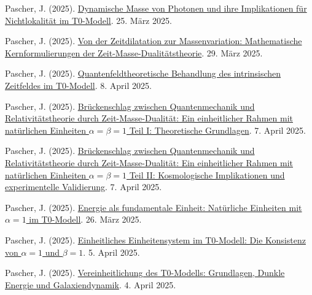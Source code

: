 \documentclass[12pt,a4paper]{article}
\begin{document}
\begin{thebibliography}{99}
		 Pascher, J. (2025). \href{https://github.com/jpascher/T0-Time-Mass-Duality/tree/main/2/pdf/Deutsch/DynMassePhotonenNichtlokal.pdf}{Dynamische Masse von Photonen und ihre Implikationen für Nichtlokalität im T0-Modell}. 25. März 2025.
		
		 Pascher, J. (2025). \href{https://github.com/jpascher/T0-Time-Mass-Duality/tree/main/2/pdf/Deutsch/MathZeitMasseLagrange.pdf}{Von der Zeitdilatation zur Massenvariation: Mathematische Kernformulierungen der Zeit-Masse-Dualitätstheorie}. 29. März 2025.
		
		 Pascher, J. (2025). \href{https://github.com/jpascher/T0-Time-Mass-Duality/tree/main/2/pdf/Deutsch/QFTIntrinsischesZeitT0.pdf}{Quantenfeldtheoretische Behandlung des intrinsischen Zeitfeldes im T0-Modell}. 8. April 2025.
		
		 Pascher, J. (2025). \href{https://github.com/jpascher/T0-Time-Mass-Duality/tree/main/2/pdf/Deutsch/QMRelTimeMassPart1Z.pdf}{Brückenschlag zwischen Quantenmechanik und Relativitätstheorie durch Zeit-Masse-Dualität: Ein einheitlicher Rahmen mit natürlichen Einheiten $\alpha = \beta = 1$ Teil I: Theoretische Grundlagen}. 7. April 2025.
		
		 Pascher, J. (2025). \href{https://github.com/jpascher/T0-Time-Mass-Duality/tree/main/2/pdf/Deutsch/QMRelTimeMassPart2Z.pdf}{Brückenschlag zwischen Quantenmechanik und Relativitätstheorie durch Zeit-Masse-Dualität: Ein einheitlicher Rahmen mit natürlichen Einheiten $\alpha = \beta = 1$ Teil II: Kosmologische Implikationen und experimentelle Validierung}. 7. April 2025.
		
		 Pascher, J. (2025). \href{https://github.com/jpascher/T0-Time-Mass-Duality/tree/main/2/pdf/Deutsch/NatEinheitenAlpha1.pdf}{Energie als fundamentale Einheit: Natürliche Einheiten mit $\alpha = 1$ im T0-Modell}. 26. März 2025.
		
		 Pascher, J. (2025). \href{https://github.com/jpascher/T0-Time-Mass-Duality/tree/main/2/pdf/Deutsch/Alpha1Beta1Konsistenz.pdf}{Einheitliches Einheitensystem im T0-Modell: Die Konsistenz von $\alpha = 1$ und $\beta = 1$}. 5. April 2025.
		
		 Pascher, J. (2025). \href{https://github.com/jpascher/T0-Time-Mass-Duality/tree/main/2/pdf/Deutsch/T0VereinheitlichungDEGal.pdf}{Vereinheitlichung des T0-Modells: Grundlagen, Dunkle Energie und Galaxiendynamik}. 4. April 2025.
		

\end{thebibliography}
\end{document}
